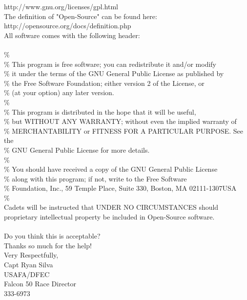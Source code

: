 \documentclass{article}
\begin{document}
http://www.gnu.org/licenses/gpl.html \\

\noindent The definition of "Open-Source" can be found here: \\

http://opensource.org/docs/definition.php \\

\noindent All software comes with the following header: \\
 \\
\% \\
\%    This program is free software; you can redistribute it and/or modify \\
\%    it under the terms of the GNU General Public License as published by \\
\%    the Free Software Foundation; either version 2 of the License, or \\
\%    (at your option) any later version. \\
\% \\
\%    This program is distributed in the hope that it will be useful, \\
\%    but WITHOUT ANY WARRANTY; without even the implied warranty of \\
\%    MERCHANTABILITY or FITNESS FOR A PARTICULAR PURPOSE.  See the \\
\%    GNU General Public License for more details. \\
\% \\
\%    You should have received a copy of the GNU General Public License \\
\%    along with this program; if not, write to the Free Software \\
\%    Foundation, Inc., 59 Temple Place, Suite 330, Boston, MA  02111-1307USA \\
\%  \\

\noindent Cadets will be instructed that UNDER NO CIRCUMSTANCES should proprietary intellectual property be included in Open-Source software. \\
\hspace{0pt} \\
\noindent Do you think this is acceptable? \\

\noindent Thanks so much for the help! \\

\noindent Very Respectfully, \\
Capt Ryan Silva \\
USAFA/DFEC \\
Falcon 50 Race Director \\
333-6973 \\
\end{document}
